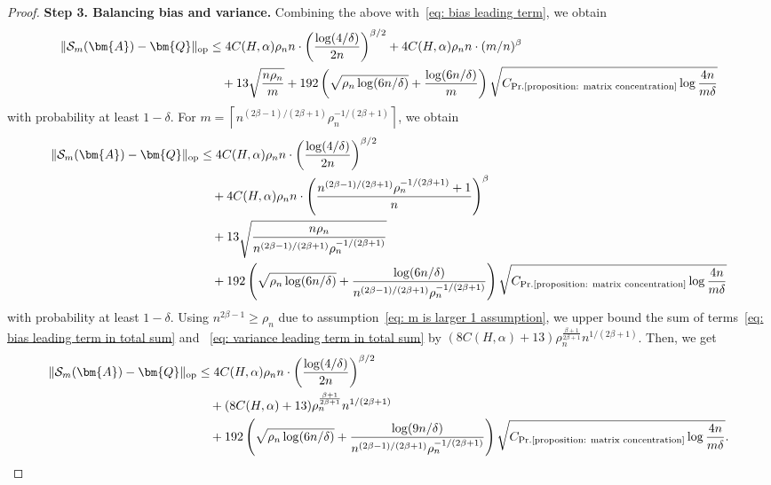 \documentclass[11pt]{article}
\newcommand{\op}{\mathrm{op}}
\newcommand{\bA}{\bm{A}}
\newcommand{\bQ}{\bm{Q}}
\newcommand{\constantBandeira}{C_{\text{Pr.\ref{proposition: matrix concentration}}}}
\newcommand{\<}{\langle}
\renewcommand{\>}{\rangle}
\newcommand{\cS}{\mathcal{S}}
\theoremstyle{plain}
\theoremstyle{definition}
\theoremstyle{remark}
\begin{document}
{\begin{proof}
\noindent \textbf{Step 3. Balancing bias and variance.} Combining the above with~\eqref{eq: bias leading term}, we obtain
\begin{align*}
    \Vert \cS_m(\bA) - \bQ \Vert_{\op} & \le 4 C(H, \alpha)  \rho_n n \cdot \left ( \frac{\log(4/\delta)}{2 n} \right )^{\beta/2} + 4 C(H, \alpha) \rho_n n \cdot (m/n)^{\beta} \\
    & \quad + 13 \sqrt{\frac{n \rho_n}{m}} + 192 \left ( \sqrt{\rho_n \log(6 n/\delta)} + \frac{\log(6n/\delta)}{m}\right ) \sqrt{\constantBandeira \log \frac{4 n}{m\delta}}
\end{align*}
with probability at least $1 - \delta$.
For $m = \left \lceil n^{(2 \beta - 1)/(2 \beta + 1)} \rho_n^{-1/(2 \beta + 1)} \right \rceil$, we obtain
\begin{align}
    \Vert \cS_m(\bA) - \bQ \Vert_{\op} & \le 4 C(H, \alpha)  \rho_n n \cdot \left ( \frac{\log(4/\delta)}{2 n} \right )^{\beta/2} \nonumber \\
    & \quad + 4 C(H, \alpha) \rho_n n \cdot \left (\frac{n^{(2 \beta - 1)/(2 \beta + 1)} \rho_n^{-1/(2 \beta + 1)} +1}{n} \right )^{\beta}  \label{eq: bias leading term in total sum} \\
    & \quad + 13 \sqrt{\frac{n \rho_n}{n^{(2 \beta - 1)/(2 \beta + 1)} \rho_n^{-1/(2 \beta + 1)}}} \label{eq: variance leading term in total sum} \\
    & \quad + 192 \left ( \sqrt{\rho_n \log(6 n/\delta)} + \frac{\log(6n/\delta)}{n^{(2 \beta - 1)/(2 \beta + 1)} \rho_n^{-1/(2 \beta + 1)}}\right ) \sqrt{\constantBandeira \log \frac{4 n}{m\delta}} \nonumber
\end{align}
with probability at least $1 - \delta$.
Using $n^{2\beta - 1} \ge \rho_n$ due to assumption~\eqref{eq: m is larger 1 assumption}, we upper bound the sum of terms~\eqref{eq: bias leading term in total sum} and~
\eqref{eq: variance leading term in total sum} by $(8 C(H, \alpha) + 13)\rho_n^{\frac{\beta + 1}{2 \beta + 1}} n^{1/(2 \beta + 1)}$. Then, we get
\begin{align}
     \Vert \cS_m(\bA) - \bQ \Vert_{\op} & \le 4 C(H, \alpha)  \rho_n n \cdot \left ( \frac{\log(4/\delta)}{2n} \right )^{\beta/2} \nonumber \\
    & \quad + (8 C(H, \alpha) + 13)\rho_n^{\frac{\beta + 1}{2 \beta + 1}} n^{1/(2 \beta + 1)
    } \label{eq: varaince term - simplified sum} \\
    & \quad + 192 \left ( \sqrt{\rho_n \log(6 n/\delta)} + \frac{\log(9n/\delta)}{n^{(2 \beta - 1)/(2 \beta + 1)} \rho_n^{-1/(2 \beta + 1)}}\right ) \sqrt{\constantBandeira \log \frac{4 n}{m\delta}} \label{eq: remainder - simplified sum}.

\end{align}
\end{proof}}
\end{document}
